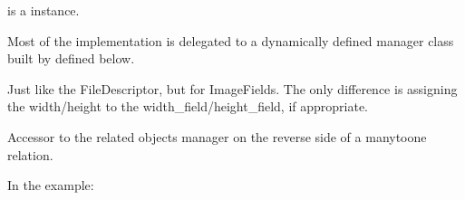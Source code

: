 \documentclass[letterpaper,10pt,english]{sphinxmanual}
\begin{document}
\begin{fulllineitems}
\begin{fulllineitems}
 is a  instance.

Most of the implementation is delegated to a dynamically defined manager
class built by  defined below.

\end{fulllineitems}


\begin{fulllineitems}
\label{\detokenize{accounts:accounts.models.User.phone_regex}}
\end{fulllineitems}


\begin{fulllineitems}
\label{\detokenize{accounts:accounts.models.User.pic}}
Just like the FileDescriptor, but for ImageFields. The only difference is
assigning the width/height to the width\_field/height\_field, if appropriate.

\end{fulllineitems}


\begin{fulllineitems}
\label{\detokenize{accounts:accounts.models.User.post_set}}
Accessor to the related objects manager on the reverse side of a
many\sphinxhyphen{}to\sphinxhyphen{}one relation.

In the example:

\begin{sphinxVerbatim}[commandchars=\\\{\}]
 
       
\end{sphinxVerbatim}


\end{fulllineitems}
\end{fulllineitems}
\end{document}
